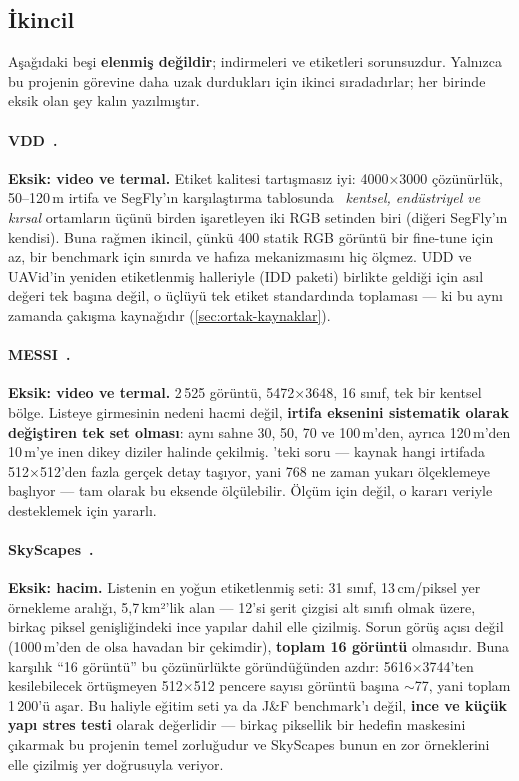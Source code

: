 \subsection*{İkincil}

Aşağıdaki beşi \textbf{elenmiş değildir}; indirmeleri ve etiketleri
sorunsuzdur. Yalnızca bu projenin görevine daha uzak durdukları için
ikinci sıradadırlar; her birinde eksik olan şey kalın yazılmıştır.

\paragraph{VDD~\cite{cai2023vdd}.}
\textbf{Eksik: video ve termal.} Etiket kalitesi tartışmasız iyi:
4000×3000 çözünürlük, 50--120\,m irtifa ve SegFly'ın karşılaştırma
tablosunda~\cite{segfly2026} \emph{kentsel, endüstriyel ve kırsal}
ortamların üçünü birden işaretleyen iki RGB setinden biri (diğeri
SegFly'ın kendisi). Buna rağmen ikincil, çünkü 400 statik RGB görüntü
bir fine-tune için az, bir benchmark için sınırda ve hafıza
mekanizmasını hiç ölçmez. UDD ve UAVid'in
yeniden etiketlenmiş halleriyle (IDD paketi) birlikte geldiği için asıl
değeri tek başına değil, o üçlüyü tek etiket standardında toplaması ---
ki bu aynı zamanda çakışma kaynağıdır (\cref{sec:ortak-kaynaklar}).

\paragraph{MESSI~\cite{pinkovich2025messi}.}
\textbf{Eksik: video ve termal.} 2\,525 görüntü, 5472×3648, 16 sınıf,
tek bir kentsel bölge. Listeye girmesinin nedeni hacmi değil,
\textbf{irtifa eksenini sistematik olarak değiştiren tek set olması}:
aynı sahne 30, 50, 70 ve 100\,m'den, ayrıca 120\,m'den 10\,m'ye inen
dikey diziler halinde çekilmiş. 'teki soru ---
kaynak hangi irtifada 512×512'den fazla gerçek detay taşıyor, yani 768
ne zaman yukarı ölçeklemeye başlıyor --- tam olarak bu eksende
ölçülebilir. Ölçüm için değil, o kararı veriyle desteklemek için
yararlı.

\paragraph{SkyScapes~\cite{azimi2019skyscapes}.}
\textbf{Eksik: hacim.} Listenin en yoğun etiketlenmiş seti: 31 sınıf,
13\,cm/piksel yer örnekleme aralığı, 5,7\,km²'lik alan --- 12'si şerit
çizgisi alt sınıfı olmak üzere, birkaç piksel genişliğindeki ince
yapılar dahil elle çizilmiş. Sorun görüş açısı değil (1000\,m'den de
olsa havadan bir çekimdir), \textbf{toplam 16 görüntü} olmasıdır.
Buna karşılık ``16 görüntü'' bu çözünürlükte göründüğünden azdır:
5616×3744'ten kesilebilecek örtüşmeyen 512×512 pencere sayısı görüntü
başına $\sim$77, yani toplam 1\,200'ü aşar. Bu haliyle eğitim seti ya
da J\&F benchmark'ı değil, \textbf{ince ve küçük yapı stres testi}
olarak değerlidir --- birkaç piksellik bir hedefin maskesini çıkarmak
bu projenin temel zorluğudur ve SkyScapes bunun en zor örneklerini
elle çizilmiş yer doğrusuyla veriyor.

